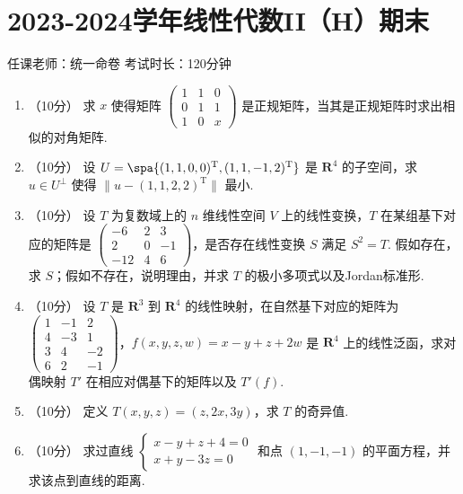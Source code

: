 \section{2023-2024学年线性代数II（H）期末}

\begin{center}
    任课老师：统一命卷\hspace{4em} 考试时长：120分钟
\end{center}

\begin{enumerate}
    \item （10分）
    求 $x$ 使得矩阵 $\begin{pmatrix}
        1 & 1 & 0 \\
        0 & 1 & 1 \\
        1 & 0 & x
    \end{pmatrix}$ 是正规矩阵，当其是正规矩阵时求出相似的对角矩阵.

    \item （10分）
    设 $U = \spa\{(1,1,0,0)^{\mathrm{T}},(1,1,-1,2)^{\mathrm{T}}\}$ 是 $\mathbf{R}^4$ 的子空间，求 $u \in U^\perp$ 使得 $\lVert u - (1,1,2,2)^{\mathrm{T}} \rVert$ 最小.

    \item （10分）
    设 $T$ 为复数域上的 $n$ 维线性空间 $V$ 上的线性变换，$T$ 在某组基下对应的矩阵是 $\begin{pmatrix}
        -6 & 2 & 3 \\
        2 & 0 & -1 \\
        -12 & 4 & 6
    \end{pmatrix}$，是否存在线性变换 $S$ 满足 $S^2 = T$. 假如存在，求 $S$；假如不存在，说明理由，并求 $T$ 的极小多项式以及Jordan标准形.

    \item （10分）
    设 $T$ 是 $\mathbf{R}^3$ 到 $\mathbf{R}^4$ 的线性映射，在自然基下对应的矩阵为 $\begin{pmatrix}
        1 & -1 & 2 \\
        4 & -3 & 1 \\
        3 & 4 & -2 \\
        6 & 2 & -1
    \end{pmatrix}$，$f(x,y,z,w) = x - y + z + 2w$ 是 $\mathbf{R}^4$ 上的线性泛函，求对偶映射 $T'$ 在相应对偶基下的矩阵以及 $T'(f)$.

    \item （10分）
    定义 $T(x,y,z) = (z,2x,3y)$，求 $T$ 的奇异值.

    \item （10分）
    求过直线 $\begin{cases}
        x - y + z + 4 = 0 \\
        x + y - 3z = 0
    \end{cases}$ 和点 $(1,-1,-1)$ 的平面方程，并求该点到直线的距离.


\end{enumerate}
